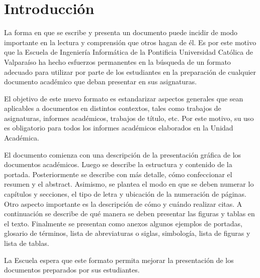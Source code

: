 \section{Introducción}

La forma en que se escribe y presenta un documento puede incidir de modo importante
en la lectura y comprensión que otros hagan de él. Es por este motivo que la Escuela de
Ingeniería Informática de la Pontificia Universidad Católica de Valparaíso ha hecho esfuerzos
permanentes en la búsqueda de un formato adecuado para utilizar por parte de los estudiantes
en la preparación de cualquier documento académico que deban presentar en sus asignaturas.

El objetivo de este nuevo formato es estandarizar aspectos generales que sean aplicables
a documentos en distintos contextos, tales como trabajos de asignaturas, informes académicos,
trabajos de título, etc. Por este motivo, su uso es obligatorio para todos los informes
académicos elaborados en la Unidad Académica.

El documento comienza con una descripción de la presentación gráfica de los
documentos académicos. Luego se describe la estructura y contenido de la portada.
Posteriormente se describe con más detalle, cómo confeccionar el resumen y el abstract.
Asimismo, se plantea el modo en que se deben numerar lo capítulos y secciones, el tipo de
letra y ubicación de la numeración de páginas. Otro aspecto importante es la descripción de
cómo y cuándo realizar citas. A continuación se describe de qué manera se deben presentar las
figuras y tablas en el texto. Finalmente se presentan como anexos algunos ejemplos de
portadas, glosario de términos, lista de abreviaturas o siglas, simbología, lista de figuras y lista
de tablas.

La Escuela espera que este formato permita mejorar la presentación de los documentos
preparados por sus estudiantes. 